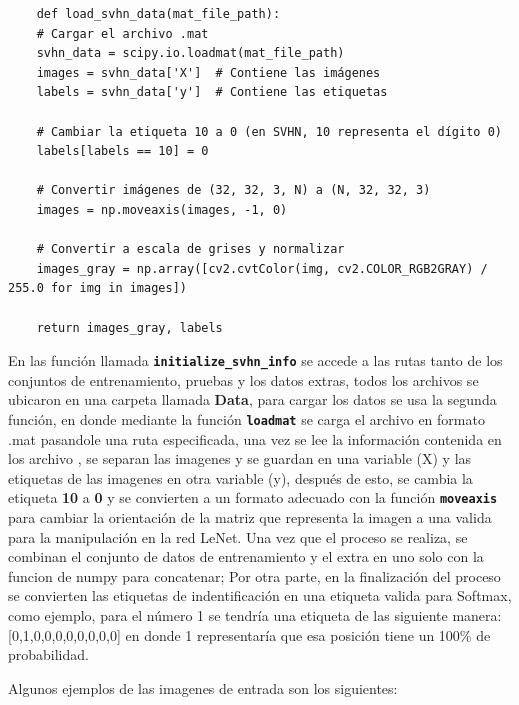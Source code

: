 \begin{lstlisting}
    def load_svhn_data(mat_file_path):
    # Cargar el archivo .mat
    svhn_data = scipy.io.loadmat(mat_file_path)
    images = svhn_data['X']  # Contiene las imágenes
    labels = svhn_data['y']  # Contiene las etiquetas

    # Cambiar la etiqueta 10 a 0 (en SVHN, 10 representa el dígito 0)
    labels[labels == 10] = 0

    # Convertir imágenes de (32, 32, 3, N) a (N, 32, 32, 3)
    images = np.moveaxis(images, -1, 0)
    
    # Convertir a escala de grises y normalizar
    images_gray = np.array([cv2.cvtColor(img, cv2.COLOR_RGB2GRAY) / 255.0 for img in images])

    return images_gray, labels
\end{lstlisting}

En las función llamada \textbf{\texttt{initialize\_svhn\_info}} se accede a las rutas tanto de los conjuntos de entrenamiento, pruebas
y los datos extras, todos los archivos se ubicaron en una carpeta llamada \textbf{Data}, para cargar los datos se usa la segunda función,
en donde mediante la función \textbf{\texttt{loadmat}} se carga el archivo en formato .mat pasandole una ruta especificada, una
vez se lee la información contenida en los archivo , se separan las imagenes y se guardan en una variable (X) y las etiquetas de 
las imagenes en otra variable (y), después de esto, se cambia la etiqueta \textbf{10} a \textbf{0} y se convierten a un formato
adecuado con la función \textbf{\texttt{moveaxis}} para cambiar la orientación de la matriz que representa la imagen a una valida
para la manipulación en la red LeNet. Una vez que el proceso se realiza, se combinan el conjunto de datos de entrenamiento y el 
extra en uno solo con la funcion de numpy para concatenar; Por otra parte, en la finalización del proceso se convierten las etiquetas
de indentificación en una etiqueta valida para Softmax, como ejemplo, para el número 1 se tendría una etiqueta de las siguiente manera:
[0,1,0,0,0,0,0,0,0,0] en donde 1 representaría que esa posición tiene un 100\% de probabilidad.

Algunos ejemplos de las imagenes de entrada son los siguientes:

